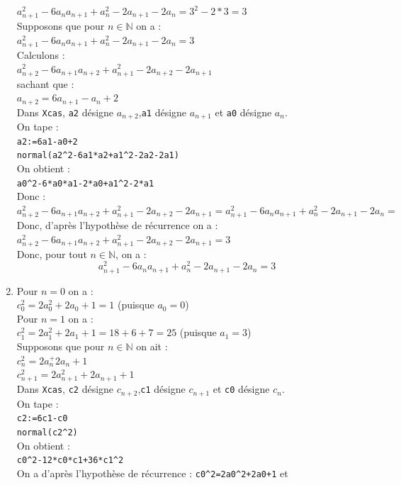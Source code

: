 \documentclass[a4paper,11pt]{book}
\newcommand{\N}{{\mathbb{N}}}
\begin{document}
\begin{enumerate}
$a_{n+1}^2-6a_na_{n+1}+a_n^2-2a_{n+1}-2a_n=3^2-2*3=3$\\
Supposons que pour $n\in \N$ on a :\\
$a_{n+1}^2-6a_na_{n+1}+a_n^2-2a_{n+1}-2a_n=3$\\
Calculons :\\
$a_{n+2}^2-6a_{n+1}a_{n+2}+a_{n+1}^2-2a_{n+2}-2a_{n+1}$\\
sachant que :\\
$a_{n+2}=6a_{n+1}-a_n+2$\\
Dans {\tt Xcas}, {\tt a2} d\'esigne $a_{n+2}$,{\tt a1} d\'esigne $a_{n+1}$ et 
{\tt a0} d\'esigne $a_n$.\\
On tape :\\
{\tt a2:=6a1-a0+2}\\
{\tt normal(a2\verb|^|2-6a1*a2+a1\verb|^|2-2a2-2a1)}\\
On obtient :\\
{\tt a0\verb|^|2-6*a0*a1-2*a0+a1\verb|^|2-2*a1}\\
Donc :\\
$a_{n+2}^2-6a_{n+1}a_{n+2}+a_{n+1}^2-2a_{n+2}-2a_{n+1}=a_{n+1}^2-6a_na_{n+1}+a_n^2-2a_{n+1}-2a_n=$ \\
Donc, d'apr\`es l'hypoth\`ese de r\'ecurrence on a :\\
$a_{n+2}^2-6a_{n+1}a_{n+2}+a_{n+1}^2-2a_{n+2}-2a_{n+1}=3$\\
Donc, pour tout $n\in\N$, on a :
$$a_{n+1}^2-6a_na_{n+1}+a_n^2-2a_{n+1}-2a_n=3$$
\item
Pour $n=0$ on a :\\
$c_0^2=2a_0^2+2a_0+1=1$ (puisque $a_0=0$)\\
Pour $n=1$ on a :\\
$c_1^2=2a_1^2+2a_1+1=18+6+7=25$ (puisque $a_1=3$)\\
Supposons que pour $n\in \N$ on ait :\\
$c_n^2=2a_n^+2a_n+1$\\
$c_{n+1}^2=2a_{n+1}^2+2a_{n+1}+1$\\
Dans {\tt Xcas}, {\tt c2} d\'esigne $c_{n+2}$,{\tt c1} d\'esigne $c_{n+1}$ et 
{\tt c0} d\'esigne $c_n$.\\
On tape :\\
{\tt c2:=6c1-c0}\\
{\tt normal(c2\verb|^|2)}\\
On obtient :\\
{\tt c0\verb|^|2-12*c0*c1+36*c1\verb|^|2}\\
On a d'apr\`es l'hypoth\`ese de r\'ecurrence :
{\tt c0\verb|^|2=2a0\verb|^|2+2a0+1} et\\

\end{enumerate}
\end{document}
